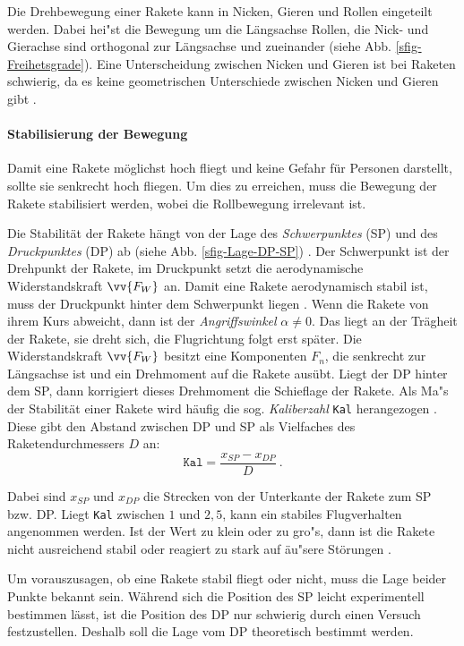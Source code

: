 \documentclass[10pt,a4paper]{article}
\begin{document}
Die Drehbewegung einer Rakete kann in Nicken, Gieren und Rollen eingeteilt werden. Dabei hei"st die Bewegung um die Längsachse Rollen, die Nick- und Gierachse sind orthogonal zur Längsachse und zueinander (siehe Abb. \ref{sfig-Freihetsgrade}). Eine Unterscheidung zwischen Nicken und Gieren ist bei Raketen schwierig, da es keine geometrischen Unterschiede zwischen Nicken und Gieren gibt \cite{AbR}.

\paragraph{Stabilisierung der Bewegung}
Damit eine Rakete möglichst hoch fliegt und keine Gefahr für Personen darstellt, sollte sie senkrecht hoch fliegen. Um dies zu erreichen, muss die Bewegung der Rakete stabilisiert werden, wobei die Rollbewegung irrelevant ist.

Die Stabilität der Rakete hängt von der Lage des \textit{Schwerpunktes} (SP) und des \textit{Druckpunktes} (DP) ab (siehe Abb. \ref{sfig-Lage-DP-SP}) \cite{AbR}. Der Schwerpunkt ist der  Drehpunkt der Rakete, im Druckpunkt setzt die aerodynamische Widerstandskraft $ \vv{F_{W}} $ \cite{AbR} an.
Damit eine Rakete aerodynamisch stabil ist, muss der Druckpunkt hinter dem Schwerpunkt liegen \cite{AbR,om}. Wenn die Rakete von ihrem Kurs abweicht, dann ist der \textit{Angriffswinkel} $\alpha \neq 0$. Das liegt an der Trägheit der Rakete, sie dreht sich, die Flugrichtung folgt erst später. Die Widerstandskraft $\vv{F_{W}}$ besitzt eine Komponenten $F_{n}$, die senkrecht zur Längsachse ist und ein Drehmoment auf die Rakete ausübt. Liegt der DP hinter dem SP, dann korrigiert dieses Drehmoment die Schieflage der Rakete.
Als Ma"s der Stabilität einer Rakete wird häufig die sog. \textit{Kaliberzahl} \texttt{Kal} herangezogen \cite{AbR,dl,om,sn}. Diese gibt den Abstand zwischen DP und SP als Vielfaches des Raketendurchmessers $D$ an:
\begin{equation}
\mathtt{Kal} = \frac{x_{SP}-x_{DP}}{D} \ .
\end{equation}

\noindent
Dabei sind $x_{SP}$ und $x_{DP}$ die Strecken von der Unterkante der Rakete zum SP bzw. DP. Liegt \texttt{Kal} zwischen $1$ und $2,5$, kann ein stabiles Flugverhalten angenommen werden. Ist der Wert zu klein oder zu gro"s, dann ist die Rakete nicht ausreichend stabil oder reagiert zu stark auf äu"sere Störungen \cite{om}.

Um vorauszusagen, ob eine Rakete stabil fliegt oder nicht, muss die Lage beider Punkte bekannt sein. Während sich die Position des SP leicht experimentell bestimmen lässt, ist die Position des DP nur schwierig durch einen Versuch festzustellen. Deshalb soll die Lage vom DP theoretisch bestimmt werden.
\end{document}
